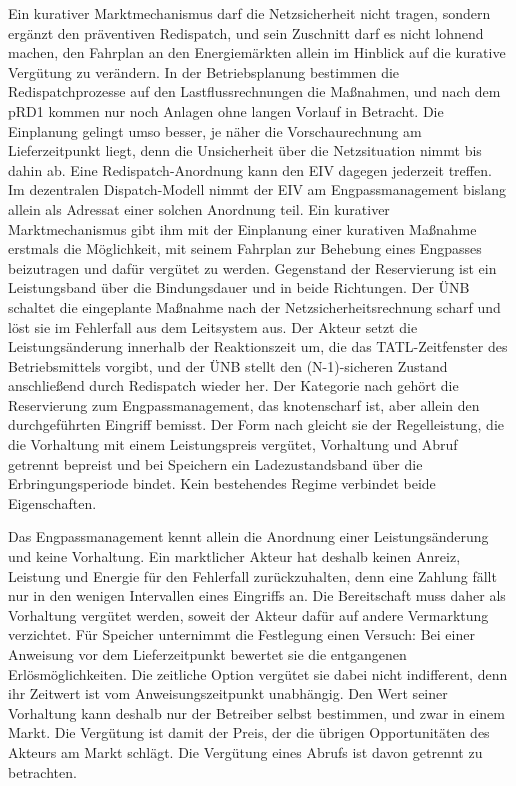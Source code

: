 Ein kurativer Marktmechanismus darf die Netzsicherheit nicht tragen, sondern ergänzt den präventiven Redispatch, und sein Zuschnitt darf es nicht lohnend machen, den Fahrplan an den Energiemärkten allein im Hinblick auf die kurative Vergütung zu verändern.
In der Betriebsplanung bestimmen die Redispatchprozesse auf den Lastflussrechnungen die Maßnahmen, und nach dem pRD1 kommen nur noch Anlagen ohne langen Vorlauf in Betracht.
Die Einplanung gelingt umso besser, je näher die Vorschaurechnung am Lieferzeitpunkt liegt, denn die Unsicherheit über die Netzsituation nimmt bis dahin ab.
Eine Redispatch-Anordnung kann den \ac{EIV} dagegen jederzeit treffen.
Im dezentralen Dispatch-Modell nimmt der \ac{EIV} am Engpassmanagement bislang allein als Adressat einer solchen Anordnung teil.
Ein kurativer Marktmechanismus gibt ihm mit der Einplanung einer kurativen Maßnahme erstmals die Möglichkeit, mit seinem Fahrplan zur Behebung eines Engpasses beizutragen und dafür vergütet zu werden.
Gegenstand der Reservierung ist ein Leistungsband über die Bindungsdauer und in beide Richtungen.
Der \ac{ÜNB} schaltet die eingeplante Maßnahme nach der Netzsicherheitsrechnung scharf und löst sie im Fehlerfall aus dem Leitsystem aus.
Der Akteur setzt die Leistungsänderung innerhalb der Reaktionszeit um, die das \ac{TATL}-Zeitfenster des Betriebsmittels vorgibt, und der \ac{ÜNB} stellt den \mbox{(N-1)-sicheren} Zustand anschließend durch Redispatch wieder her.
Der Kategorie nach gehört die Reservierung zum Engpassmanagement, das knotenscharf ist, aber allein den durchgeführten Eingriff bemisst.
Der Form nach gleicht sie der Regelleistung, die die Vorhaltung mit einem Leistungspreis vergütet, Vorhaltung und Abruf getrennt bepreist und bei Speichern ein Ladezustandsband über die Erbringungsperiode bindet.
Kein bestehendes Regime verbindet beide Eigenschaften.

Das Engpassmanagement kennt allein die Anordnung einer Leistungsänderung und keine Vorhaltung.
Ein marktlicher Akteur hat deshalb keinen Anreiz, Leistung und Energie für den Fehlerfall zurückzuhalten, denn eine Zahlung fällt nur in den wenigen Intervallen eines Eingriffs an.
Die Bereitschaft muss daher als Vorhaltung vergütet werden, soweit der Akteur dafür auf andere Vermarktung verzichtet.
Für Speicher unternimmt die Festlegung einen Versuch: Bei einer Anweisung vor dem Lieferzeitpunkt bewertet sie die entgangenen Erlösmöglichkeiten.
Die zeitliche Option vergütet sie dabei nicht indifferent, denn ihr Zeitwert ist vom Anweisungszeitpunkt unabhängig.
Den Wert seiner Vorhaltung kann deshalb nur der Betreiber selbst bestimmen, und zwar in einem Markt.
Die Vergütung ist damit der Preis, der die übrigen Opportunitäten des Akteurs am Markt schlägt.
Die Vergütung eines Abrufs ist davon getrennt zu betrachten.


